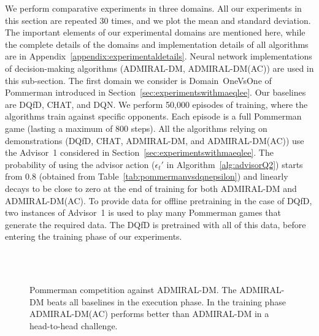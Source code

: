 \documentclass[jair, twoside,11pt,theapa]{article}
\begin{document}
We perform comparative experiments in three domains. All our experiments in this section are repeated 30 times, and we plot the mean and standard deviation. The important elements of our experimental domains are mentioned here, while the complete details of the domains and implementation details of all algorithms are in Appendix~\ref{appendix:experimentaldetails}. Neural network implementations of decision-making algorithms (ADMIRAL-DM, ADMIRAL-DM(AC)) are used in this sub-section. The first domain we consider is Domain~OneVsOne of Pommerman introduced in Section~\ref{sec:experimentswithmaeqlee}. Our baselines are DQfD, CHAT, and DQN. We perform 50,000 episodes of training, where the algorithms train against specific opponents. Each episode is a full Pommerman game (lasting a maximum of 800 steps).
All the algorithms relying on demonstrations (DQfD, CHAT, ADMIRAL-DM, and ADMIRAL-DM(AC)) use the Advisor~1 considered in Section~\ref{sec:experimentswithmaeqlee}. The probability of using the advisor action ($\epsilon_t'$ in Algorithm~\ref{alg:advisorQ2}) starts from 0.8 (obtained from Table~\ref{tab:pommermanvsdqnepsilon}) and linearly decays to be close to zero at the end of training for both ADMIRAL-DM and ADMIRAL-DM(AC). To provide data for offline pretraining in the case of DQfD, two instances of Advisor~1 is used to play many Pommerman games that generate the required data. The DQfD is pretrained with all of this data, before entering the training phase of our experiments. 


\begin{figure}[h]
    \centering
	\\
	\\
  \caption{Pommerman competition against ADMIRAL-DM. The ADMIRAL-DM beats all baselines in the execution phase. In the training phase ADMIRAL-DM(AC) performs better than ADMIRAL-DM in a head-to-head challenge. 
  }%
	\label{fig:pommermantraining}
\end{figure}
 
\end{document}
